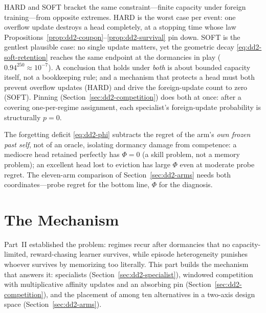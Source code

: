 \begin{keypoint}[title={Two models, one phenomenon, bounded from both ends}]
HARD and SOFT bracket the same constraint---finite capacity under foreign
training---from opposite extremes. HARD is the worst case per event: one
overflow update destroys a head completely, at a stopping time whose law
Propositions~\ref{prop:dd2-coupon}--\ref{prop:dd2-survival} pin down. SOFT is
the gentlest plausible case: no single update matters, yet the geometric
decay \eqref{eq:dd2-soft-retention} reaches the same endpoint at the
dormancies in play ($0.94^{250} \approx 10^{-7}$). A conclusion that holds
under \emph{both} is about bounded capacity itself, not a bookkeeping rule;
and a mechanism that protects a head must both prevent overflow updates
(HARD) and drive the foreign-update count to zero (SOFT). Pinning
(Section~\ref{sec:dd2-competition}) does both at once: after a covering
one-per-regime assignment, each specialist's foreign-update probability is
structurally $p = 0$.
\end{keypoint}

\begin{remark}
The forgetting deficit \eqref{eq:dd2-phi} subtracts the regret of the
arm's \emph{own frozen past self}, not of an oracle, isolating dormancy
damage from competence: a mediocre head retained perfectly has $\Phi = 0$
(a skill problem, not a memory problem); an excellent head lost to eviction
has large $\Phi$ even at moderate probe regret. The eleven-arm comparison of
Section~\ref{sec:dd2-arms} needs both coordinates---probe regret for the
bottom line, $\Phi$ for the diagnosis.
\end{remark}

\part{The \nm{} Mechanism}
\label{sec:dd2-part-mechanism}

Part~II established the problem: regimes recur after dormancies that no
capacity-limited, reward-chasing learner survives, while episode
heterogeneity punishes whoever survives by memorizing too literally. This
part builds the mechanism that answers it: specialists
(Section~\ref{sec:dd2-specialist}), windowed competition with multiplicative
affinity updates and an absorbing pin (Section~\ref{sec:dd2-competition}),
and the placement of \nm{} among ten alternatives in a two-axis design space
(Section~\ref{sec:dd2-arms}).

